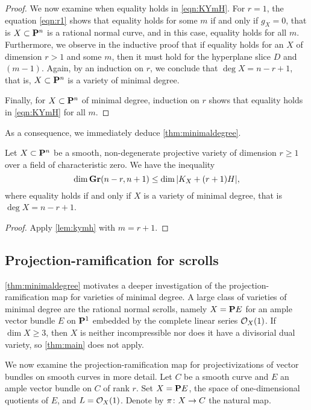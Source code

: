 \begin{proof}
  We now examine when equality holds in \eqref{eqn:KYmH}.
  For $r = 1$, the equation \eqref{eqn:r1} shows that equality holds for some $m$ if and only if $g_X = 0$, that is $X \subset \P^n$ is a rational normal curve, and in this case, equality holds for all $m$.
  Furthermore, we observe in the inductive proof that if equality holds for an $X$ of dimension $r > 1$ and some $m$, then it must hold for the hyperplane slice $D$ and $(m-1)$.
  Again, by an induction on $r$, we conclude that $\deg X = n-r+1$, that is, $X \subset \P^n$ is a variety of minimal degree.

  Finally, for $X \subset \P^n$ of minimal degree, induction on $r$ shows that equality holds in \eqref{eqn:KYmH} for all $m$.
\end{proof}

As a consequence, we immediately deduce \autoref{thm:minimaldegree}.
\begin{proposition}
  \label{thm:actualminimaldegree}
  Let $X \subset \P^n$ be a smooth, non-degenerate projective variety of dimension $r \geq 1$ over a field of characteristic zero.
  We have the inequality
  \[ \dim \Gr(n-r, n+1) \leq \dim |K_X + (r+1)H|,\]
  where equality holds if and only if $X$ is a variety of minimal degree, that is $\deg X = n-r+1$.
\end{proposition}
\begin{proof}
  Apply \autoref{lem:kymh} with $m = r+1$.
\end{proof}

\subsection{Projection-ramification for scrolls}\label{sec:prscrolls}
\autoref{thm:minimaldegree} motivates a deeper investigation of the projection-ramification map for varieties of minimal degree.
A large class of varieties of minimal degree are the rational normal scrolls, namely $X = \P E$ for an ample vector bundle $E$ on $\P^1$ embedded by the complete linear series $\O_X(1)$.
If $\dim X \geq 3$, then $X$ is neither incompressible nor does it have a divisorial dual variety, so \autoref{thm:main} does not apply.

We now examine the projection-ramification map for projectivizations of vector bundles on smooth curves in more detail.
Let $C$ be a smooth curve and $E$ an ample vector bundle on $C$ of rank $r$.
Set $X = \P E$, the space of one-dimensional quotients of $E$, and $L = \O_X(1)$.
Denote by $\pi \from X \to C$ the natural map.

